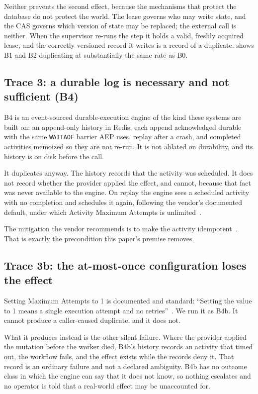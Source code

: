 Neither prevents the second effect, because the mechanisms that protect the
database do not protect the world. The lease governs who may write state, and
the CAS governs which version of state may be replaced; the external call is
neither. When the supervisor re-runs the step it holds a valid, freshly
acquired lease, and the correctly versioned record it writes is a record of a
duplicate.  shows B1 and B2 duplicating at substantially
the same rate as B0.

\subsection{Trace 3: a durable log is necessary and not sufficient (B4)}

B4 is an event-sourced durable-execution engine of the kind these systems are
built on: an append-only history in Redis, each append acknowledged durable
with the same \texttt{WAITAOF} barrier AEP uses, replay after a crash,
and completed activities memoized so they are not re-run. It is not ablated on
durability, and its history is on disk before the call.

It duplicates anyway. The history records that the activity was scheduled. It
does not record whether the provider applied the effect, and cannot, because
that fact was never available to the engine. On replay the engine sees a
scheduled activity with no completion and schedules it again, following the
vendor's documented default, under which Activity Maximum Attempts is
unlimited~\cite{temporal-retry}.

The mitigation the vendor recommends is to make the activity
idempotent~\cite{temporal-activity-definition}. That is exactly the
precondition this paper's premise removes.

\subsection{Trace 3b: the at-most-once configuration loses the effect}

Setting Maximum Attempts to 1 is documented and standard: ``Setting the value
to 1 means a single execution attempt and no retries''~\cite{temporal-retry}.
We run it as B4b. It cannot produce a caller-caused duplicate, and it does not.

What it produces instead is the other silent failure. Where the provider
applied the mutation before the worker died, B4b's history records an activity
that timed out, the workflow fails, and the effect exists while the records
deny it. That record is an ordinary failure and not a declared
ambiguity. B4b has no outcome class in which the engine can say that it does
not know, so nothing escalates and no operator is told that a
real-world effect may be unaccounted for.

